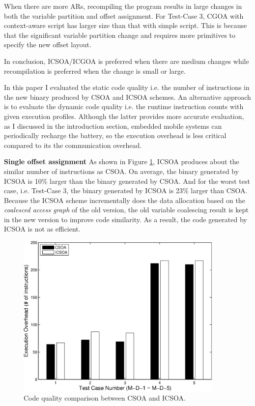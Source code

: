 When there are more ARs, recompiling the program results in large changes in both the variable
partition and offset assignment. For Test-Case 3, CGOA with context-aware script has larger size than that with simple 
script. This is because that the significant variable partition change and requires more primitives to specify the new 
offset layout. 

In conclusion, ICSOA/ICGOA is preferred when there are medium changes while recompilation is preferred when the change 
is small or large.


In this paper I evaluated the static code quality i.e. the number of instructions in the new binary produced by CSOA 
and ICSOA schemes. An alternative approach is to evaluate the dynamic code quality i.e. the runtime instruction counts 
with given execution profiles. Although the latter provides more accurate evaluation, as I discussed in the 
introduction section, embedded mobile systems can periodically recharge the battery, so the execution overhead is less 
critical compared to its the communication overhead.

\textbf{Single offset assignment}
As shown in Figure \ref{exetotal}, ICSOA produces about the similar number of instructions as CSOA. On average, the 
binary generated by ICSOA is 10\% larger than the binary generated by CSOA. And for the worst test case, i.e. Test-Case 
3, the binary generated by ICSOA is 23\% larger than CSOA. Because the ICSOA scheme incrementally does the data 
allocation based on the {\it coalesced access graph} of the old version, the old variable coalescing result is kept in 
the new version to improve code similarity. As a result, the code generated by ICSOA is not as efficient. 

\begin{figure}[htbp]
\begin{center}
\includegraphics[width=4in]{./figures/da-exe1.eps}
\caption{Code quality comparison between CSOA and ICSOA.}
\label{exetotal}
\end{center}
\vspace{-0.2in}
\end{figure}


